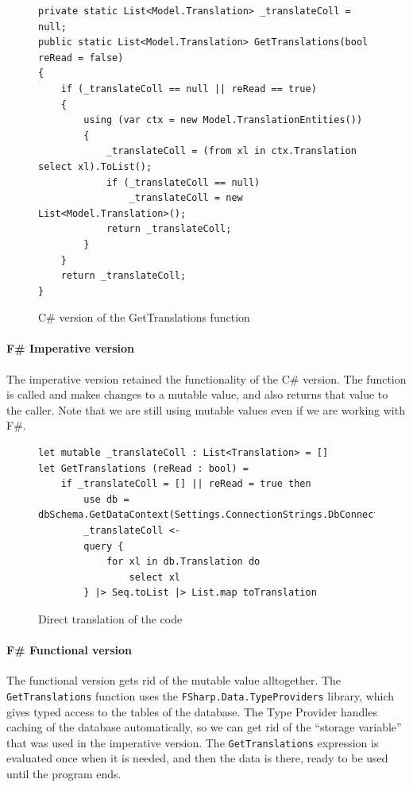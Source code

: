 \documentclass[12pt, a4paper]{article}
\newcommand{\code}[1]{{\small \texttt{#1}}}
\begin{document}
\begin{figure}[!h]
\begin{lstlisting}
private static List<Model.Translation> _translateColl = null; 
public static List<Model.Translation> GetTranslations(bool reRead = false)
{
    if (_translateColl == null || reRead == true)
    {
        using (var ctx = new Model.TranslationEntities())
        {
            _translateColl = (from xl in ctx.Translation select xl).ToList();
            if (_translateColl == null)
                _translateColl = new List<Model.Translation>();
            return _translateColl;
        }
    }
    return _translateColl;
}
\end{lstlisting}
\caption{C\# version of the GetTranslations function}
\end{figure}

\newpage


\paragraph{F\# Imperative version} The imperative version retained the functionality of the C\# version. The function is called and makes changes to a mutable value, and also returns that value to the caller. Note that we are still using mutable values even if we are working with F\#.

\begin{figure}[!h]
\begin{lstlisting}
let mutable _translateColl : List<Translation> = []
let GetTranslations (reRead : bool) =
    if _translateColl = [] || reRead = true then
        use db = dbSchema.GetDataContext(Settings.ConnectionStrings.DbConnectionString)
        _translateColl <- 
        query {
            for xl in db.Translation do 
                select xl
        } |> Seq.toList |> List.map toTranslation
\end{lstlisting}
\caption{Direct translation of the code}
\end{figure}

\newpage


\paragraph{F\# Functional version} The functional version gets rid of the mutable value alltogether. The \code{GetTranslations} function uses the \code{FSharp.Data.TypeProviders} library, which gives typed access to the tables of the database. The Type Provider handles caching of the database automatically, so we can get rid of the “storage variable” that was used in the imperative version. The \code{GetTranslations} expression is evaluated once when it is needed, and then the data is there, ready to be used until the program ends.
\end{document}
